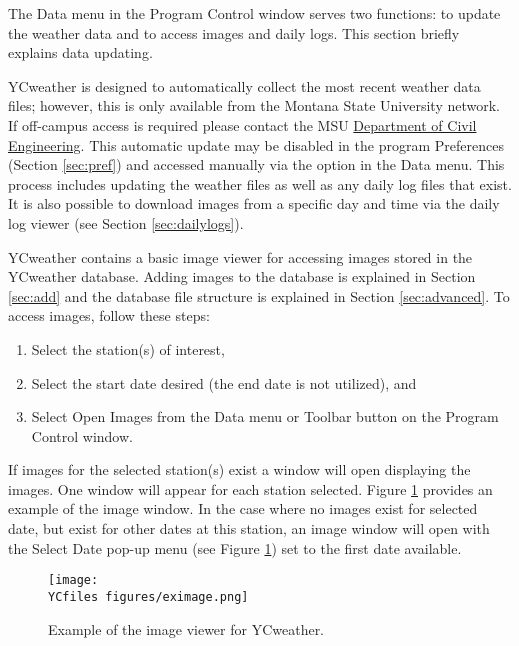 \label{sec:data}
The Data menu in the Program Control window serves two functions: to update the weather data and to access images and daily logs.  This section briefly explains data updating.  

YCweather is designed to automatically collect the most recent weather data files; however, this is only available from the Montana State University network. If off-campus access is required please contact the MSU \href{http://www.coe.montana.edu/ce/}{Department of Civil Engineering}. This automatic update may be disabled in the program Preferences (Section \ref{sec:pref}) and accessed manually via the  option in the Data menu.  This process includes updating the weather files as well as any daily log files that exist.  It is also possible to download images from a specific day and time via the daily log viewer (see Section \ref{sec:dailylogs}).

 \label{sec:images}
YCweather contains a basic image viewer for accessing images stored in the YCweather database.  Adding images to the database is explained in Section \ref{sec:add} and the database file structure is explained in Section \ref{sec:advanced}.  To access images, follow these steps:
\begin{enumerate}
	\item Select the station(s) of interest,
	\item Select the start date desired (the end date is not utilized), and
	\item Select Open Images from the Data menu or Toolbar button on the Program Control window.
\end{enumerate}

If images for the selected station(s) exist a window will open displaying the images. One window will appear for each station selected.  Figure \ref{fig:eximage} provides an example of the image window.  In the case where no images exist for selected date, but exist for other dates at this station, an image window will open with the Select Date pop-up menu (see Figure \ref{fig:eximage}) set to the first date available.  

\begin{figure}[ht!]\centering
	\texttt{[image: \\YCfiles figures/eximage.png]}
	\caption{Example of the image viewer for YCweather.}
	\label{fig:eximage}
\end{figure}

